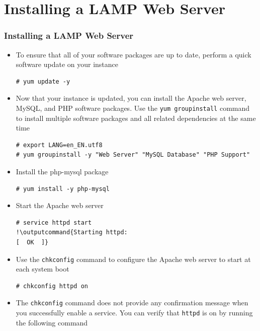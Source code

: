 \documentclass{beamer}
\newcommand{\outputcommand}[1]{\color{darkgreen}{#1}}
\begin{document}
\section{Installing a LAMP Web Server}
\begin{frame}
\frametitle{Installing a LAMP Web Server}
\begin{itemize}
\item To ensure that all of your software packages are up to date, perform a quick software update on your instance

\lstset{language=shell, escapechar=!}
\begin{lstlisting}[escapechar=!]
# yum update -y
\end{lstlisting}
\item Now that your instance is updated, you can install the Apache web server, MySQL, and PHP software packages. Use the \texttt{yum groupinstall} command to install multiple software packages and all related dependencies at the same time
\lstset{language=shell}
\begin{lstlisting}[escapechar=!]
# export LANG=en_EN.utf8
# yum groupinstall -y "Web Server" "MySQL Database" "PHP Support"
\end{lstlisting}
\item Install the php-mysql package
\lstset{language=shell}
\begin{lstlisting}[escapechar=!]
# yum install -y php-mysql
\end{lstlisting}

\item Start the Apache web server

\lstset{language=shell}
\begin{lstlisting}[escapechar=!]
# service httpd start
!\outputcommand{Starting httpd:                                            [  OK  ]}
\end{lstlisting}

\item Use the \texttt{chkconfig} command to configure the Apache web server to start at each system boot
\lstset{language=shell}
\begin{lstlisting}[escapechar=!]
# chkconfig httpd on
\end{lstlisting}

\item The \texttt{chkconfig} command does not provide any confirmation message when you successfully enable a service. You can verify that \texttt{httpd} is on by running the following command


\end{itemize}
\end{frame}
\end{document}
